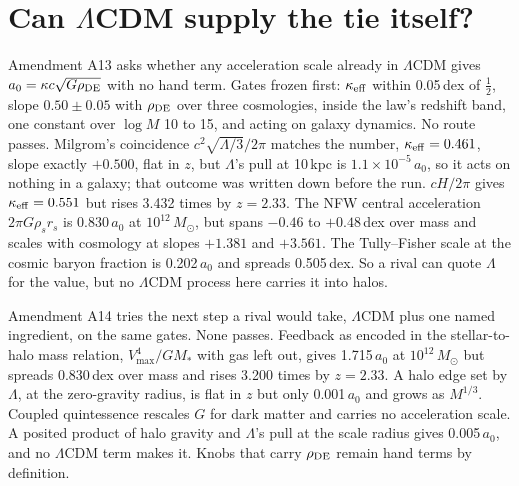 \documentclass[11pt]{article}
\begin{document}
\section{Can $\Lambda$CDM supply the tie itself?}
Amendment A13 asks whether any acceleration scale already in $\Lambda$CDM gives $a_0=\kappa c\sqrt{G\rho_{\rm DE}}$ with no hand term. Gates frozen first: $\kappa_{\rm eff}$ within 0.05\,dex of $\tfrac12$, slope $0.50\pm0.05$ with $\rho_{\rm DE}$ over three cosmologies, inside the law's redshift band, one constant over $\log M$ 10 to 15, and acting on galaxy dynamics. No route passes. Milgrom's coincidence $c^2\sqrt{\Lambda/3}/2\pi$ matches the number, $\kappa_{\rm eff}=0.461$, slope exactly $+0.500$, flat in $z$, but $\Lambda$'s pull at 10\,kpc is $1.1\times10^{-5}\,a_0$, so it acts on nothing in a galaxy; that outcome was written down before the run. $cH/2\pi$ gives $\kappa_{\rm eff}=0.551$ but rises 3.432 times by $z=2.33$. The NFW central acceleration $2\pi G\rho_s r_s$ is 0.830\,$a_0$ at $10^{12}\,M_\odot$, but spans $-0.46$ to $+0.48$\,dex over mass and scales with cosmology at slopes $+1.381$ and $+3.561$. The Tully--Fisher scale at the cosmic baryon fraction is 0.202\,$a_0$ and spreads 0.505\,dex. So a rival can quote $\Lambda$ for the value, but no $\Lambda$CDM process here carries it into halos.

Amendment A14 tries the next step a rival would take, $\Lambda$CDM plus one named ingredient, on the same gates. None passes. Feedback as encoded in the stellar-to-halo mass relation, $V_{\max}^4/GM_*$ with gas left out, gives 1.715\,$a_0$ at $10^{12}\,M_\odot$ but spreads 0.830\,dex over mass and rises 3.200 times by $z=2.33$. A halo edge set by $\Lambda$, at the zero-gravity radius, is flat in $z$ but only 0.001\,$a_0$ and grows as $M^{1/3}$. Coupled quintessence \cite{amendola00} rescales $G$ for dark matter and carries no acceleration scale. A posited product of halo gravity and $\Lambda$'s pull at the scale radius gives 0.005\,$a_0$, and no $\Lambda$CDM term makes it. Knobs that carry $\rho_{\rm DE}$ remain hand terms by definition.
\end{document}
